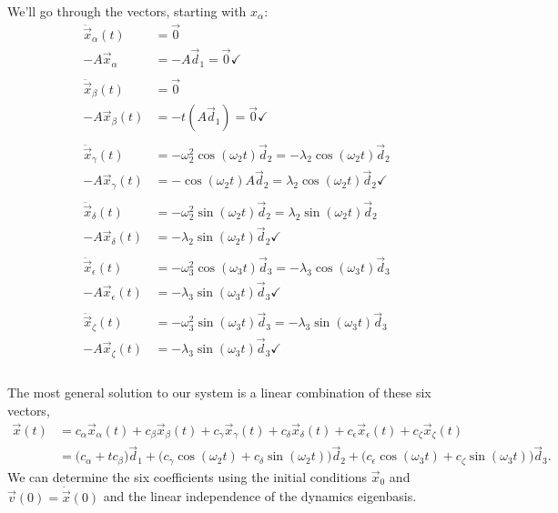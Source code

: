 \documentclass{article}
\begin{document}
\begin{solution}
	We'll go through the vectors, starting with $x_\alpha$:
	\begin{align*}
		\ddot {\vec x}_{\alpha}(t) &= \vec 0\\
		-A\vec x_{\alpha} &= -A\vec d_1 = \vec 0 \checkmark\\
		\\
		\ddot{\vec x}_{\beta}(t) &= \vec 0 \\
		-A \vec x_{\beta}(t) &= -t(A \vec d_1) = \vec 0 \checkmark \\
		\\
		\ddot{\vec x}_{\gamma}(t) &= -\omega_2^2 \cos(\omega_2t) \vec d_2 = -\lambda_2 \cos(\omega_2t) \vec d_2\\
		-A \vec x_{\gamma}(t) &= -\cos(\omega_2t)A\vec d_2 = \lambda_2 \cos(\omega_2t)\vec d_2 \checkmark\\
		\\
		\ddot{\vec x}_\delta(t) &= -\omega_2^2 \sin(\omega_2t)\vec d_2 = \lambda_2 \sin (\omega_2t)\vec d_2 \\
		-A \vec x_{\delta}(t) &= -\lambda_2 \sin(\omega_2t) \vec d_2 \checkmark \\
		\\
		\ddot{\vec x}_\epsilon(t) &= -\omega_3^2\cos(\omega_3t) \vec d_3 = -\lambda_3 \cos(\omega_3t) \vec d_3 \\		 -A \vec x_{\epsilon}(t) &= -\lambda_3\sin(\omega_3t) \vec d_3 \checkmark \\
		\\
		\ddot{\vec x}_\zeta(t) &= -\omega_3^2 \sin(\omega_3t) \vec d_3 = -\lambda_3 \sin(\omega_3t) \vec d_3 \\
		-A \vec x_{\zeta}(t) &= -\lambda_3 \sin(\omega_3t) \vec d_3 \checkmark \\
	\end{align*} 
\end{solution}

\phline
\paragraph{}
The most general solution to our system is a linear combination of these six vectors,
	\begin{align}
		\vec{x}(t) &= c_{\alpha}\vec{x}_{\alpha}(t) + c_{\beta}\vec{x}_{\beta}(t) + c_{\gamma}\vec{x}_{\gamma}(t) 
				+ c_{\delta}\vec{x}_{\delta}(t) + c_{\epsilon}\vec{x}_{\epsilon}(t) + c_{\zeta}\vec{x}_{\zeta}(t)\nonumber\\
				&= \big(c_{\alpha}+tc_{\beta}\big)\vec{d}_{1} 
				+ \big(c_{\gamma}\cos(\omega_{2}t) +c_{\delta}\sin(\omega_{2}t)\big)\vec{d}_{2}
				+ \big(c_{\epsilon}\cos(\omega_{3}t) +c_{\zeta}\sin(\omega_{3}t)\big)\vec{d}_{3}.
		\label{evolve}
	\end{align}
We can determine the six coefficients using the initial conditions $\vec{x}_{0}$ and $\vec{v}(0) = \dot{\vec{x}}(0)$ and the linear independence of the dynamics
eigenbasis.
\end{document}
